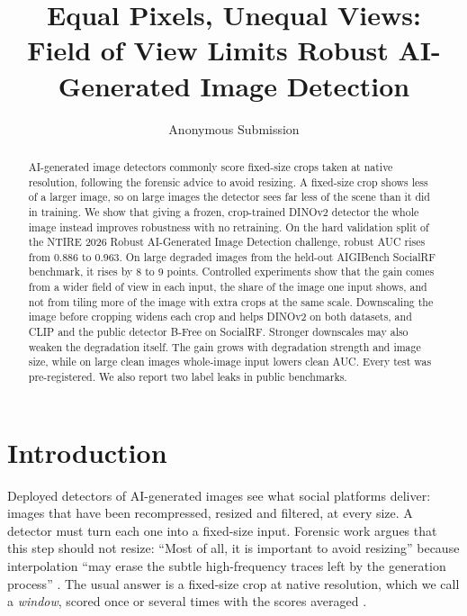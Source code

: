 \documentclass[letterpaper]{article} %
\title{Equal Pixels, Unequal Views:\\Field of View Limits Robust AI-Generated Image Detection}
\author{Anonymous Submission}
\begin{document}
\maketitle

\begin{abstract}
AI-generated image detectors commonly score fixed-size crops taken at native
resolution, following the forensic advice to avoid resizing. A fixed-size crop
shows less of a larger image, so on large images the detector sees far less of
the scene than it did in training. We show that giving a frozen, crop-trained
DINOv2 detector the whole image instead improves robustness with no
retraining. On the hard validation split of the NTIRE 2026 Robust
AI-Generated Image Detection challenge, robust AUC rises from 0.886 to 0.963.
On large degraded images from the held-out AIGIBench SocialRF benchmark, it
rises by 8 to 9 points. Controlled experiments show that the gain comes from a
wider field of view in each input, the share of the image one input shows,
and not from tiling more of the image with extra crops at the same scale.
Downscaling the image before cropping widens each crop and helps DINOv2 on
both datasets, and CLIP and the public detector B-Free on SocialRF. Stronger
downscales may also weaken the degradation itself. The gain grows with
degradation strength and image size, while on large clean images whole-image
input lowers clean AUC. Every test was pre-registered. We also report two
label leaks in public benchmarks.
\end{abstract}

\section{Introduction}
\label{sec:intro}

Deployed detectors of AI-generated images see what social platforms deliver:
images that have been recompressed, resized and filtered, at every size. A
detector must turn each one into a fixed-size input. Forensic work argues
that this step should not resize: ``Most of all, it is important
to avoid resizing'' because interpolation ``may erase the subtle
high-frequency traces left by the generation process''
\cite{corvi2023detection}. The usual answer is a fixed-size crop at native
resolution, which we call a \emph{window}, scored once or several times with
the scores averaged
\cite{corvi2023detection,li2025safe,guillaro2025bfree,konstantinidou2025texturecrop}.
\end{document}
